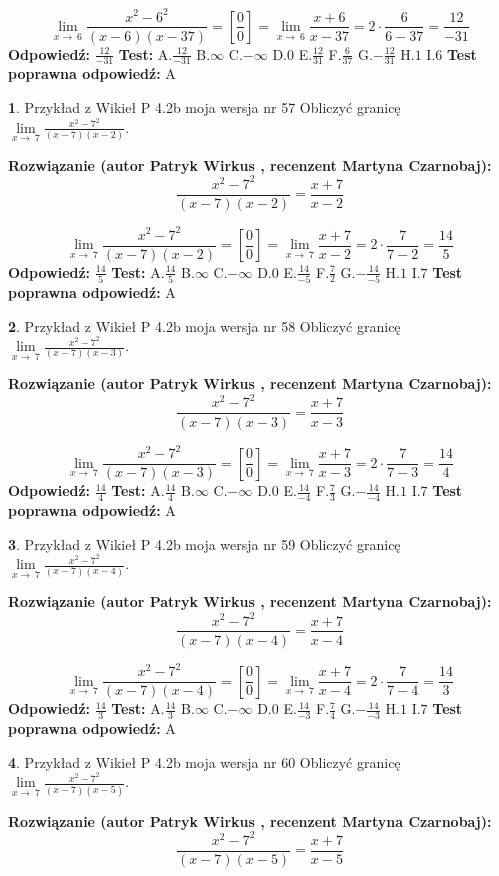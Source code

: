 \documentclass[12pt, a4paper]{article}
\theoremstyle{definition} %
\newtheorem{zad}{}
\newcommand{\zadStart}[1]{\begin{zad}#1\newline}
\newcommand{\zadStop}{\end{zad}}
\newcommand{\rozwStart}[2]{\noindent \textbf{Rozwiązanie (autor #1 , recenzent #2): }\newline}
\newcommand{\rozwStop}{\newline}
\newcommand{\odpStart}{\noindent \textbf{Odpowiedź:}\newline}
\newcommand{\odpStop}{\newline}
\newcommand{\testStart}{\noindent \textbf{Test:}\newline}
\newcommand{\testStop}{\newline}
\newcommand{\kluczStart}{\noindent \textbf{Test poprawna odpowiedź:}\newline}
\newcommand{\kluczStop}{\newline}
\begin{document}
$$\lim\limits_{x\to\ 6}\frac{x^{2}-6^{2}}{(x-6)(x-37)}=[\frac{0}{0}]=\lim\limits_{x\to\ 6}\frac{x+6}{x-37}=2 \cdot \frac{6}{6-37} = \frac{12}{-31}$$
\rozwStop
\odpStart
$\frac{12}{-31}$
\odpStop
\testStart
A.$\frac{12}{-31}$
B.$\infty$
C.$-\infty$
D.$0$
E.$\frac{12}{31}$
F.$\frac{6}{37}$
G.$-\frac{12}{31}$
H.$1$
I.$6$
\testStop
\kluczStart
A
\kluczStop



\zadStart{Przykład z Wikieł P 4.2b moja wersja nr 57}
Obliczyć granicę $\lim\limits_{x\to\ 7}\frac{x^{2}-7^{2}}{(x-7)(x-2)}$.
\zadStop
\rozwStart{Patryk Wirkus}{Martyna Czarnobaj}
$$\frac{x^{2}-7^{2}}{(x-7)(x-2)}=\frac{x+7}{x-2}$$

$$\lim\limits_{x\to\ 7}\frac{x^{2}-7^{2}}{(x-7)(x-2)}=[\frac{0}{0}]=\lim\limits_{x\to\ 7}\frac{x+7}{x-2}=2 \cdot \frac{7}{7-2} = \frac{14}{5}$$
\rozwStop
\odpStart
$\frac{14}{5}$
\odpStop
\testStart
A.$\frac{14}{5}$
B.$\infty$
C.$-\infty$
D.$0$
E.$\frac{14}{-5}$
F.$\frac{7}{2}$
G.$-\frac{14}{-5}$
H.$1$
I.$7$
\testStop
\kluczStart
A
\kluczStop



\zadStart{Przykład z Wikieł P 4.2b moja wersja nr 58}
Obliczyć granicę $\lim\limits_{x\to\ 7}\frac{x^{2}-7^{2}}{(x-7)(x-3)}$.
\zadStop
\rozwStart{Patryk Wirkus}{Martyna Czarnobaj}
$$\frac{x^{2}-7^{2}}{(x-7)(x-3)}=\frac{x+7}{x-3}$$

$$\lim\limits_{x\to\ 7}\frac{x^{2}-7^{2}}{(x-7)(x-3)}=[\frac{0}{0}]=\lim\limits_{x\to\ 7}\frac{x+7}{x-3}=2 \cdot \frac{7}{7-3} = \frac{14}{4}$$
\rozwStop
\odpStart
$\frac{14}{4}$
\odpStop
\testStart
A.$\frac{14}{4}$
B.$\infty$
C.$-\infty$
D.$0$
E.$\frac{14}{-4}$
F.$\frac{7}{3}$
G.$-\frac{14}{-4}$
H.$1$
I.$7$
\testStop
\kluczStart
A
\kluczStop



\zadStart{Przykład z Wikieł P 4.2b moja wersja nr 59}
Obliczyć granicę $\lim\limits_{x\to\ 7}\frac{x^{2}-7^{2}}{(x-7)(x-4)}$.
\zadStop
\rozwStart{Patryk Wirkus}{Martyna Czarnobaj}
$$\frac{x^{2}-7^{2}}{(x-7)(x-4)}=\frac{x+7}{x-4}$$

$$\lim\limits_{x\to\ 7}\frac{x^{2}-7^{2}}{(x-7)(x-4)}=[\frac{0}{0}]=\lim\limits_{x\to\ 7}\frac{x+7}{x-4}=2 \cdot \frac{7}{7-4} = \frac{14}{3}$$
\rozwStop
\odpStart
$\frac{14}{3}$
\odpStop
\testStart
A.$\frac{14}{3}$
B.$\infty$
C.$-\infty$
D.$0$
E.$\frac{14}{-3}$
F.$\frac{7}{4}$
G.$-\frac{14}{-3}$
H.$1$
I.$7$
\testStop
\kluczStart
A
\kluczStop



\zadStart{Przykład z Wikieł P 4.2b moja wersja nr 60}
Obliczyć granicę $\lim\limits_{x\to\ 7}\frac{x^{2}-7^{2}}{(x-7)(x-5)}$.
\zadStop
\rozwStart{Patryk Wirkus}{Martyna Czarnobaj}
$$\frac{x^{2}-7^{2}}{(x-7)(x-5)}=\frac{x+7}{x-5}$$
\end{document}
